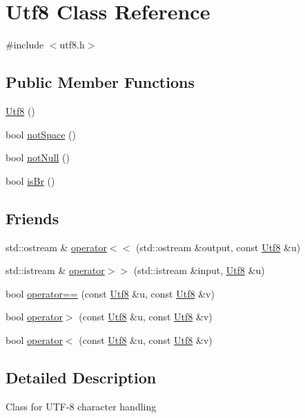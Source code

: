 \hypertarget{class_utf8}{\section{Utf8 Class Reference}
\label{class_utf8}
}


{\ttfamily \#include $<$utf8.\-h$>$}

\subsection*{Public Member Functions}
\begin{DoxyCompactItemize}
\item 
\hyperlink{class_utf8_aea3f58e580b7fb3ed8f961aefdbb9248}{Utf8} ()
\item 
bool \hyperlink{class_utf8_a72c71cf43e8bf4db12dae3b95739c73e}{not\-Space} ()
\item 
bool \hyperlink{class_utf8_ada2987b0a3047f330a76318b3c99d0cc}{not\-Null} ()
\item 
bool \hyperlink{class_utf8_ac9c856a56d6f8f8487c95844f94c6b1f}{is\-Br} ()
\end{DoxyCompactItemize}
\subsection*{Friends}
\begin{DoxyCompactItemize}
\item 
std\-::ostream \& \hyperlink{class_utf8_adf7efdb1dd3c20c6c9fc763b1dadc444}{operator$<$$<$} (std\-::ostream \&output, const \hyperlink{class_utf8}{Utf8} \&u)
\item 
std\-::istream \& \hyperlink{class_utf8_ad15b5d0c4142ae3d72718db9bb3526b6}{operator$>$$>$} (std\-::istream \&input, \hyperlink{class_utf8}{Utf8} \&u)
\item 
bool \hyperlink{class_utf8_aad19f67bcbf91d10a9c94e713869ecbc}{operator==} (const \hyperlink{class_utf8}{Utf8} \&u, const \hyperlink{class_utf8}{Utf8} \&v)
\item 
bool \hyperlink{class_utf8_a55aa43861d5d089f5b48349219e515d3}{operator$>$} (const \hyperlink{class_utf8}{Utf8} \&u, const \hyperlink{class_utf8}{Utf8} \&v)
\item 
bool \hyperlink{class_utf8_ac2f8557ce9443a75715a990bb850f8c1}{operator$<$} (const \hyperlink{class_utf8}{Utf8} \&u, const \hyperlink{class_utf8}{Utf8} \&v)
\end{DoxyCompactItemize}


\subsection{Detailed Description}
Class for U\-T\-F-\/8 character handling 


